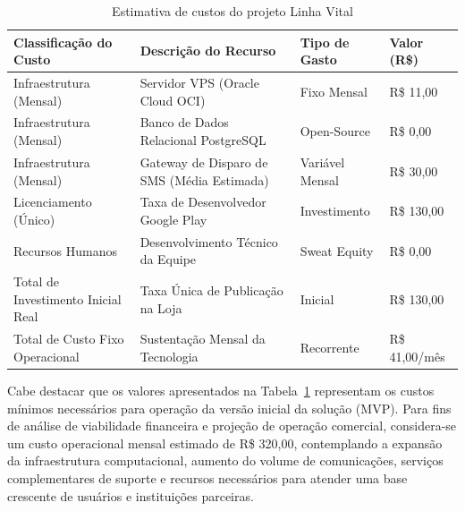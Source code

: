 \begin{table}[H]
\caption{Estimativa de custos do projeto Linha Vital}
\label{tab_custos}
\centering
\footnotesize

\begin{tabular}{|p{4cm}|p{5cm}|p{3cm}|p{2.5cm}|}
\hline
\textbf{Classificação do Custo} & \textbf{Descrição do Recurso} & \textbf{Tipo de Gasto} & \textbf{Valor (R\$)} \\
\hline

Infraestrutura (Mensal) &
Servidor VPS (Oracle Cloud OCI) &
Fixo Mensal &
R\$ 11,00 \\
\hline

Infraestrutura (Mensal) &
Banco de Dados Relacional PostgreSQL &
Open-Source &
R\$ 0,00 \\
\hline

Infraestrutura (Mensal) &
Gateway de Disparo de SMS (Média Estimada) &
Variável Mensal &
R\$ 30,00 \\
\hline

Licenciamento (Único) &
Taxa de Desenvolvedor Google Play &
Investimento &
R\$ 130,00 \\
\hline

Recursos Humanos &
Desenvolvimento Técnico da Equipe &
Sweat Equity &
R\$ 0,00 \\
\hline

Total de Investimento Inicial Real &
Taxa Única de Publicação na Loja &
Inicial &
R\$ 130,00 \\
\hline

Total de Custo Fixo Operacional &
Sustentação Mensal da Tecnologia &
Recorrente &
R\$ 41,00/mês \\
\hline

\end{tabular}

\normalsize

\end{table}

Cabe destacar que os valores apresentados na Tabela~\ref{tab_custos} representam os custos mínimos necessários para operação da versão inicial da solução (MVP). Para fins de análise de viabilidade financeira e projeção de operação comercial, considera-se um custo operacional mensal estimado de R\$ 320,00, contemplando a expansão da infraestrutura computacional, aumento do volume de comunicações, serviços complementares de suporte e recursos necessários para atender uma base crescente de usuários e instituições parceiras.
